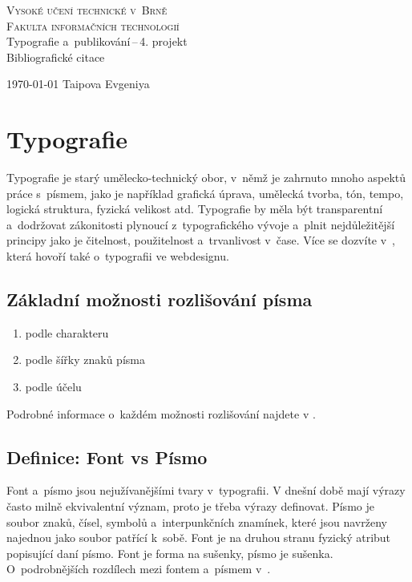 \documentclass[a4paper,11pt]{article}
\begin{document}
\begin{titlepage}
\begin{center}
\Huge\textsc{Vysoké učení technické v~Brně} \\
\huge\textsc{Fakulta informačních technologií} \\
\LARGE Typografie a~publikování\,--\,4. projekt \\
\Huge Bibliografické citace
\end{center}

{\Large \today
\hfill 
Taipova Evgeniya}
\end{titlepage}
\section{Typografie}
Typografie je starý umělecko-technický obor, v~němž je zahrnuto mnoho aspektů práce s~písmem, jako je například grafická úprava, umělecká tvorba, tón, tempo, logická struktura, fyzická velikost atd. Typografie by měla být transparentní a~dodržovat zákonitosti plynoucí z~typografického vývoje a~plnit nejdůležitější principy jako je čitelnost, použitelnost a~trvanlivost v~čase. Více se dozvíte v~\cite{Martina2016}, která hovoří také o~typografii ve webdesignu.
\subsection{Základní možnosti rozlišování písma}
\begin{enumerate}
\item podle charakteru

\item podle šířky znaků písma

\item podle účelu

\end{enumerate}
Podrobné informace o~každém možnosti rozlišování najdete v \cite{Sir2006}.
\subsection{Definice: Font vs Písmo}
Font a~písmo jsou nejužívanějšími tvary v~typografii. V dnešní době mají výrazy často milně ekvivalentní význam, proto je třeba výrazy definovat. Písmo je soubor znaků, čísel, symbolů a~interpunkčních znamínek, které jsou navrženy najednou jako soubor patřící k~sobě. Font je na druhou stranu fyzický atribut popisující daní písmo. Font je forma na sušenky, písmo je sušenka. O~podrobnějších rozdílech mezi fontem a~písmem  v~\cite{Felici2012}.
\end{document}
